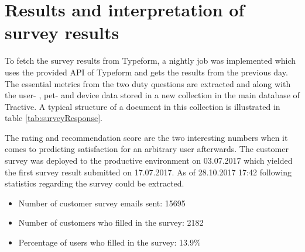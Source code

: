 \section{Results and interpretation of survey results}
\label{sec:surveyResults}
To fetch the survey results from Typeform, a nightly job was implemented which uses the provided API of Typeform and gets the results from the previous day. The essential metrics from the two duty questions are extracted and along with the user- , pet- and device data stored in a new collection in the main database of Tractive. A typical structure of a document in this collection is illustrated in table \ref{tab:surveyResponse}.

\begin{table}[]
	\centering
	\caption{Structure of a survey response represented in the company database}
	\label{tab:surveyResponse}
\end{table}

The rating and recommendation score are the two interesting numbers when it comes to predicting satisfaction for an arbitrary user afterwards. The customer survey was deployed to the productive environment on 03.07.2017 which yielded the first survey result submitted on 17.07.2017. As of 28.10.2017 17:42 following statistics regarding the survey could be extracted.

\begin{itemize}
	\item Number of customer survey emails sent: 15695
	\item Number of customers who filled in the survey: 2182
	\item Percentage of users who filled in the survey: 13.9\%
\end{itemize}

